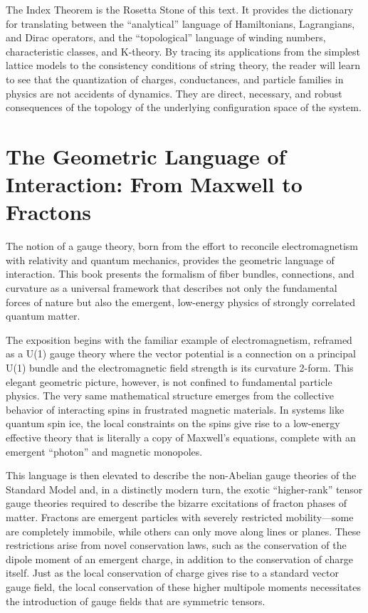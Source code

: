 The Index Theorem is the Rosetta Stone of this text. It provides the dictionary for translating between the ``analytical'' language of Hamiltonians, Lagrangians, and Dirac operators, and the ``topological'' language of winding numbers, characteristic classes, and K-theory. By tracing its applications from the simplest lattice models to the consistency conditions of string theory, the reader will learn to see that the quantization of charges, conductances, and particle families in physics are not accidents of dynamics. They are direct, necessary, and robust consequences of the topology of the underlying configuration space of the system.

\section{The Geometric Language of Interaction: From Maxwell to Fractons}

The notion of a gauge theory, born from the effort to reconcile electromagnetism with relativity and quantum mechanics, provides the geometric language of interaction. This book presents the formalism of fiber bundles, connections, and curvature as a universal framework that describes not only the fundamental forces of nature but also the emergent, low-energy physics of strongly correlated quantum matter.

The exposition begins with the familiar example of electromagnetism, reframed as a U(1) gauge theory where the vector potential is a connection on a principal U(1) bundle and the electromagnetic field strength is its curvature 2-form. This elegant geometric picture, however, is not confined to fundamental particle physics. The very same mathematical structure emerges from the collective behavior of interacting spins in frustrated magnetic materials. In systems like quantum spin ice, the local constraints on the spins give rise to a low-energy effective theory that is literally a copy of Maxwell's equations, complete with an emergent ``photon'' and magnetic monopoles.

This language is then elevated to describe the non-Abelian gauge theories of the Standard Model and, in a distinctly modern turn, the exotic ``higher-rank'' tensor gauge theories required to describe the bizarre excitations of fracton phases of matter. Fractons are emergent particles with severely restricted mobility---some are completely immobile, while others can only move along lines or planes. These restrictions arise from novel conservation laws, such as the conservation of the dipole moment of an emergent charge, in addition to the conservation of charge itself. Just as the local conservation of charge gives rise to a standard vector gauge field, the local conservation of these higher multipole moments necessitates the introduction of gauge fields that are symmetric tensors.


